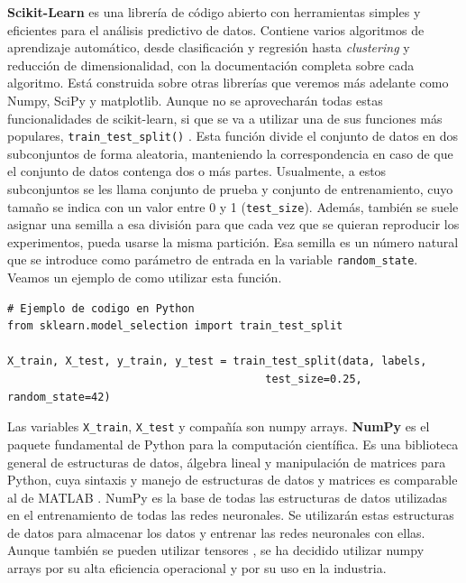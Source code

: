 \textbf{Scikit-Learn} \citep{scikitlearn} es una librería de código abierto con herramientas simples y eficientes para el análisis predictivo de datos. Contiene varios algoritmos de aprendizaje automático, desde clasificación y regresión hasta \textit{clustering} y reducción de dimensionalidad, con la documentación completa sobre cada algoritmo. Está construida sobre otras librerías que veremos más adelante como Numpy, SciPy y matplotlib. Aunque no se aprovecharán todas estas funcionalidades de scikit-learn, si que se va a utilizar una de sus funciones más populares, \lstinline|train_test_split()| \citep{traintestsplit}. Esta función divide el conjunto de datos en dos subconjuntos de forma aleatoria, manteniendo la correspondencia en caso de que el conjunto de datos contenga dos o más partes. Usualmente, a estos subconjuntos se les llama conjunto de prueba y conjunto de entrenamiento, cuyo tamaño se indica con un valor entre 0 y 1 (\lstinline|test_size|). Además, también se suele asignar una semilla a esa división para que cada vez que se quieran reproducir los experimentos, pueda usarse la misma partición. Esa semilla es un número natural que se introduce como parámetro de entrada en la variable \lstinline|random_state|. Veamos un ejemplo de como utilizar esta función.


\lstset{language=Python}
\begin{lstlisting}
# Ejemplo de codigo en Python
from sklearn.model_selection import train_test_split

X_train, X_test, y_train, y_test = train_test_split(data, labels,
                                        test_size=0.25, random_state=42)
\end{lstlisting}


Las variables \lstinline|X_train|, \lstinline|X_test| y compañía son numpy arrays. \textbf{NumPy} \citep{numpy} es el paquete fundamental de Python para la computación científica. Es una biblioteca general de estructuras de datos, álgebra lineal y manipulación de matrices para Python, cuya sintaxis y manejo de estructuras de datos y matrices es comparable al de MATLAB \citep{bloice2016tutorial}. NumPy es la base de todas las estructuras de datos utilizadas en el entrenamiento de todas las redes neuronales. Se utilizarán estas estructuras de datos para almacenar los datos y entrenar las redes neuronales con ellas. Aunque también se pueden utilizar tensores \citep{modeltraining}, se ha decidido utilizar numpy arrays por su alta eficiencia operacional y por su uso en la industria.


